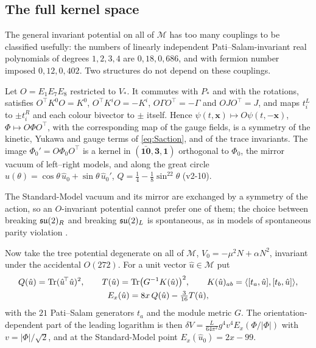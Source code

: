 \subsection{The full kernel space}
\label{sec:fullK}

The general invariant potential on all of $\mathcal M$ has too many couplings to be classified usefully: the numbers of linearly independent Pati--Salam-invariant
real polynomials of degrees $1,2,3,4$ are $0,18,0,686$, and with fermion number imposed $0,12,0,402$. Two structures do not depend on these couplings.

\begin{proposition}
\label{prop:LR}
Let $O=E_1E_7E_8$ restricted to $V_*$. It commutes with $P_*$ and with the rotations, satisfies $O^{\!\top}K^0O=K^0$, $O^{\!\top}K^iO=-K^i$, $O\Gamma O^{\!\top}=-\Gamma$ and
$OJO^{\!\top}=J$, and maps $t^L_i$ to $\pm t^R_i$ and each colour bivector to $\pm$ itself. Hence $\psi(t,\mathbf x)\mapsto O\psi(t,-\mathbf x)$, $\Phi\mapsto O\Phi O^{\!\top}$,
with the corresponding map of the gauge fields, is a symmetry of the kinetic, Yukawa and gauge terms of \eqref{eq:Saction}, and of the trace invariants. The image
$\Phi_0'=O\Phi_0O^{\!\top}$ is a kernel in $(\bar{\mathbf{10}},\mathbf3,\mathbf1)$ orthogonal to $\Phi_0$, the mirror vacuum of left--right models, and along the great circle
$\hat u(\theta)=\cos\theta\,\hat u_0+\sin\theta\,\hat u_0'$, $Q=\tfrac14-\tfrac18\sin^22\theta$ (v2-10).
\end{proposition}

The Standard-Model vacuum and its mirror are exchanged by a symmetry of the action, so an $O$-invariant potential cannot prefer one of them; the choice between
breaking $\mathfrak{su}(2)_R$ and breaking $\mathfrak{su}(2)_L$ is spontaneous, as in models of spontaneous parity violation \cite{SenjanovicMohapatra75}.

Now take the tree potential degenerate on all of $\mathcal M$, $V_0=-\mu^2N+\alpha N^2$, invariant under the accidental $O(272)$. For a unit vector $\hat u\in\mathcal M$ put
\[
\begin{gathered}
Q(\hat u)=\operatorname{Tr}(\hat u^{\!\top}\hat u)^2,\qquad T(\hat u)=\operatorname{Tr}\bigl(G^{-1}K(\hat u)\bigr)^2,\qquad K(\hat u)_{ab}=\langle[t_a,\hat u],[t_b,\hat u]\rangle,\\
E_x(\hat u)=8x\,Q(\hat u)-\tfrac3{16}T(\hat u),
\end{gathered}
\]
with the $21$ Pati--Salam generators $t_a$ and the module metric $G$. The orientation-dependent part of the leading logarithm is then
$\delta V=\tfrac L{64\pi^2}g^4v^4E_x(\Phi/|\Phi|)$ with $v=|\Phi|/\sqrt2$, and at the Standard-Model point $E_x(\hat u_0)=2x-99$.

